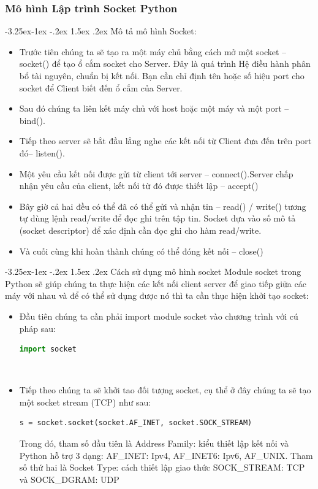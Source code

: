 \documentclass[a4paper]{article}
\makeatletter
\newcounter {subsubsubsection}[subsubsection]
\newcommand\subsubsubsection{\@startsection{subsubsubsection}{4}{\z@}%
                                     {-3.25ex\@plus -1ex \@minus -.2ex}%
                                     {1.5ex \@plus .2ex}%
                                     {\normalfont\normalsize\bfseries}}
\makeatother
\begin{document}
\subsubsection{Mô hình Lập trình Socket Python}
\subsubsubsection{Mô tả mô hình Socket:}
\begin{itemize}
 \item Trước tiên chúng ta sẽ tạo ra một máy chủ bằng cách mở một socket – socket() để tạo ổ cắm socket cho Server.  Đây là quá trình Hệ điều hành phân bổ tài nguyên, chuẩn bị kết nối. Bạn cần chỉ định tên hoặc số hiệu port cho socket để Client biết đến ổ cắm của Server.
 \item Sau đó chúng ta liên kết máy chủ với host hoặc một máy và một port – bind(). 
 \item Tiếp theo server sẽ bắt đầu lắng nghe các kết nối từ Client đưa đến trên port đó– listen().
 \item Một yêu cầu kết nối được gửi từ client tới server – connect().Server chấp nhận yêu cầu của client, kết nối từ đó được thiết lập – accept()
 \item Bây giờ cả hai đều có thể đã có thể gửi và nhận tin – read() / write() tương tự dùng lệnh read/write để đọc ghi trên tập tin.  Socket dựa vào số mô tả (socket descriptor) để xác định cần đọc ghi cho hàm read/write.
 \item Và cuối cùng khi hoàn thành chúng có thể đóng kết nối – close()
\end{itemize}
\subsubsubsection{Cách sử dụng mô hình socket}
Module socket trong Python sẽ giúp chúng ta thực hiện các kết nối client server để giao tiếp giữa các máy với nhau và để có thể sử dụng được nó thì ta cần thục hiện khởi tạo socket:\\
\begin{itemize}
    \item Đầu tiên chúng ta cần phải import module socket vào chương trình với cú pháp sau:
    \begin{mdframed}[hidealllines=true,backgroundcolor=magenta!10]
	\begin{lstlisting}[language=Python]
	   import socket
	\end{lstlisting}
    \end{mdframed}\\
    \item Tiếp theo chúng ta sẽ khởi tao đối tượng socket, cụ thể ở đây chúng ta sẽ tạo một socket stream (TCP) như sau:
    \begin{mdframed}[hidealllines=true,backgroundcolor=magenta!10]
	\begin{lstlisting}[language=Python]
          s = socket.socket(socket.AF_INET, socket.SOCK_STREAM)
	\end{lstlisting}
    \end{mdframed}
    Trong đó, tham số đầu tiên là Address Family: kiểu thiết lập kết nối và Python hỗ trợ 3 dạng: AF\_INET: Ipv4, AF\_INET6: Ipv6, AF\_UNIX. Tham số thứ hai là Socket Type: cách thiết lập giao thức SOCK\_STREAM: TCP và SOCK\_DGRAM: UDP

\end{itemize}\\
\end{document}
